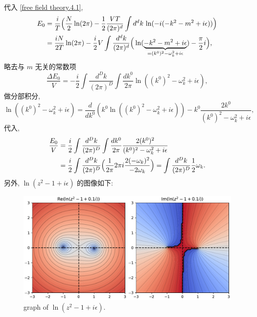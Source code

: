 \begin{itemize}
\begin{tcolorbox}[title=calculation:]
		代入 \eqref{free field theory.4.1},
		\begin{align}
			E_0 &= \frac{i}{T} \Big( \frac{N}{2} \ln (2 \pi) - \frac{1}{2} \frac{V T}{(2 \pi)^d} \int d^d k \, \ln(- i (- k^2 - m^2 + i \epsilon)) \Big) \notag \\
			&= \frac{i N}{2 T} \ln (2 \pi) - \frac{i}{2} V \int \frac{d^d k}{(2 \pi)^d} \Big( \ln(\underbrace{- k^2 - m^2 + i \epsilon}_{= (k^0)^2 - \omega_k^2 + i \epsilon}) - \frac{\pi}{2} i \Big),
		\end{align}
		略去与 $m$ 无关的常数项
		\begin{equation}
			\frac{\Delta E_0}{V} = - \frac{i}{2} \int \frac{d^D k}{(2 \pi)^D} \int \frac{dk^0}{2 \pi} \ln((k^0)^2 - \omega_k^2 + i \epsilon),
		\end{equation}
		做分部积分,
		\begin{equation}
			\ln((k^0)^2 - \omega_k^2 + i \epsilon) = \frac{d}{dk^0} (k^0 \ln((k^0)^2 - \omega_k^2 + i \epsilon)) - k^0 \frac{2 k^0}{(k^0)^2 - \omega_k^2 + i \epsilon},
		\end{equation}
		代入,
		\begin{align}
			\frac{E_0}{V} &= \frac{i}{2} \int \frac{d^D k}{(2 \pi)^D} \int \frac{dk^0}{2 \pi} \frac{2 (k^0)^2}{(k^0)^2 - \omega_k^2 + i \epsilon} \notag \\
			&= \frac{i}{2} \int \frac{d^D k}{(2 \pi)^D} \Big( \frac{1}{2 \pi} 2 \pi i \frac{2 (- \omega_k)^2}{- 2 \omega_k} \Big) = \int \frac{d^D k}{(2 \pi)^D} \frac{1}{2} \omega_k.
		\end{align}
		另外, $\ln(z^2 - 1 + i \epsilon)$ 的图像如下:
		
		\begin{figure}[H]
			\centering
			\includegraphics[scale=0.5]{figures/ln(z^2 - 1 + i epsilon).pdf}
			\caption{graph of $\ln(z^2 - 1 + i \epsilon)$.}
		\end{figure}
	\end{tcolorbox}
\end{itemize}
